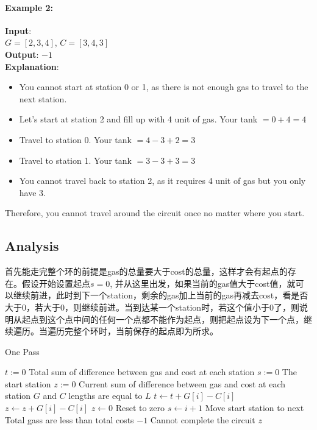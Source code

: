 \paragraph{Example 2:}
\begin{flushleft}
\textbf{Input}:
\\ 
$G  = [2,3,4]$, $C = [3,4,3]$
\\
\textbf{Output}: $-1$
\\
\textbf{Explanation}:
\begin{itemize}
\item You cannot start at station 0 or 1, as there is not enough gas to travel to the next station.
\item Let's start at station 2 and fill up with 4 unit of gas. Your tank $= 0 + 4 = 4$
\item Travel to station 0. Your tank $= 4 - 3 + 2 = 3$
\item Travel to station 1. Your tank $= 3 - 3 + 3 = 3$
\item You cannot travel back to station 2, as it requires 4 unit of gas but you only have 3.
\end{itemize}
Therefore, you cannot travel around the circuit once no matter where you start.
\end{flushleft}
\subsection{Analysis}
首先能走完整个环的前提是gas的总量要大于cost的总量，这样才会有起点的存在。假设开始设置起点$s = 0$, 并从这里出发，如果当前的gas值大于cost值，就可以继续前进，此时到下一个station，剩余的gas加上当前的gas再减去cost，看是否大于0，若大于0，则继续前进。当到达某一个station时，若这个值小于0了，则说明从起点到这个点中间的任何一个点都不能作为起点，则把起点设为下一个点，继续遍历。当遍历完整个环时，当前保存的起点即为所求。
\setcounter{algorithm}{0}
\begin{algorithm}[H]
\caption{One Pass}
\begin{algorithmic}[1]
\State $t:=0$ \Comment Total sum of difference between gas and cost at each station
\State $s:=0$ \Comment The start station
\State $z:=0$ \Comment Current sum of difference between gas and cost at each station
 \Comment $G$ and $C$ lengths are equal to $L$
\State $t\gets t + G[i] - C[i]$
\State $z\gets z + G[i] - C[i]$
\State $z\gets 0$ \Comment Reset to zero
\State $s\gets i+1$ \Comment Move start station to next
\EndIf
\EndFor
{} \Comment Total gass are less than total costs
\State \Return $-1$ \Comment Cannot complete the circuit
\Else
\State \Return $z$
\EndIf
\EndProcedure
\end{algorithmic}
\end{algorithm}
